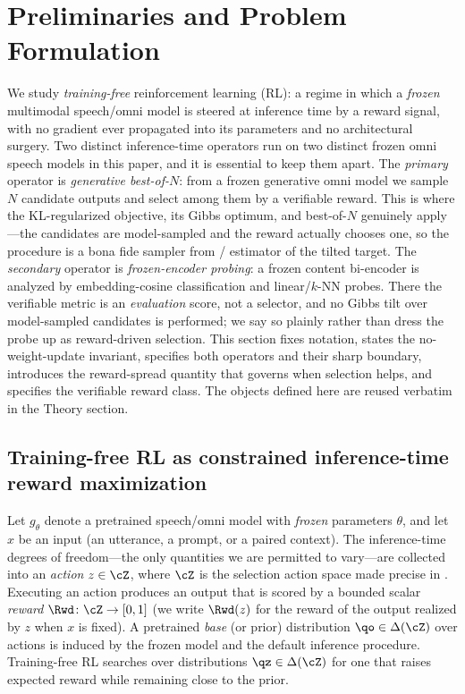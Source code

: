 \section{Preliminaries and Problem Formulation}
\label{sec:prelim}

We study \emph{training-free} reinforcement learning (RL): a regime in which a \emph{frozen} multimodal speech/omni model is steered at inference time by a reward signal, with no gradient ever propagated into its parameters and no architectural surgery. Two distinct inference-time operators run on two distinct frozen omni speech models in this paper, and it is essential to keep them apart. The \emph{primary} operator is \emph{generative best-of-$N$}: from a frozen generative omni model we sample $N$ candidate outputs and select among them by a verifiable reward. This is where the KL-regularized objective, its Gibbs optimum, and best-of-$N$ genuinely apply---the candidates are model-sampled and the reward actually chooses one, so the procedure is a bona fide sampler from / estimator of the tilted target. The \emph{secondary} operator is \emph{frozen-encoder probing}: a frozen content bi-encoder is analyzed by embedding-cosine classification and linear/$k$-NN probes. There the verifiable metric is an \emph{evaluation} score, not a selector, and no Gibbs tilt over model-sampled candidates is performed; we say so plainly rather than dress the probe up as reward-driven selection. This section fixes notation, states the no-weight-update invariant, specifies both operators and their sharp boundary, introduces the reward-spread quantity that governs when selection helps, and specifies the verifiable reward class. The objects defined here are reused verbatim in the Theory section.

\subsection{Training-free RL as constrained inference-time reward maximization}
\label{subsec:tfrl}

Let $g_\theta$ denote a pretrained speech/omni model with \emph{frozen} parameters $\theta$, and let $x$ be an input (an utterance, a prompt, or a paired context). The inference-time degrees of freedom---the only quantities we are permitted to vary---are collected into an \emph{action} $z \in \cZ$, where $\cZ$ is the selection action space made precise in . Executing an action produces an output that is scored by a bounded scalar \emph{reward} $\Rwd\colon \cZ \to [0,1]$ (we write $\Rwd(z)$ for the reward of the output realized by $z$ when $x$ is fixed). A pretrained \emph{base} (or prior) distribution $\qo \in \Delta(\cZ)$ over actions is induced by the frozen model and the default inference procedure. Training-free RL searches over distributions $\qz \in \Delta(\cZ)$ for one that raises expected reward while remaining close to the prior.

